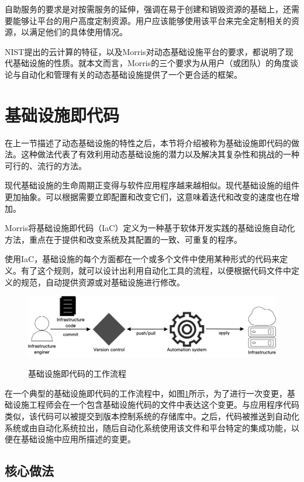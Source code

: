 \documentclass[macfonts,master]{njuthesis}
\begin{document}
自助服务的要求是对按需服务的延伸，强调在易于创建和销毁资源的基础上，还需要能够让平台的用户高度定制资源。用户应该能够使用该平台来完全定制相关的资源，以满足他们的具体使用情况\cite{morris2016infrastructure}。

NIST提出的云计算的特征，以及Morris对动态基础设施平台的要求，都说明了现代基础设施的性质。就本文而言，Morris的三个要求为从用户（或团队）的角度谈论与自动化和管理有关的动态基础设施提供了一个更合适的框架。

\section{基础设施即代码}
在上一节描述了动态基础设施的特性之后，本节将介绍被称为基础设施即代码的做法。这种做法代表了有效利用动态基础设施的潜力以及解决其复杂性和挑战的一种可行的、流行的方法。

现代基础设施的生命周期正变得与软件应用程序越来越相似。现代基础设施的组件更加抽象。可以根据需要立即配置和改变它们，这意味着迭代和改变的速度也在增加。

Morris将基础设施即代码（IaC）定义为一种基于软体开发实践的基础设施自动化方法，重点在于提供和改变系统及其配置的一致、可重复的程序\cite{morris2016infrastructure}。

使用IaC，基础设施的每个方面都在一个或多个文件中使用某种形式的代码来定义。有了这个规则，就可以设计出利用自动化工具的流程，以便根据代码文件中定义的规范，自动提供资源或对基础设施进行修改。

\begin{figure}[htbp]
  \centering
  \includegraphics[width= 1\textwidth]{pics/IaC.png}\\
  \caption{基础设施即代码的工作流程}\label{fig:IaC}
\end{figure}

在一个典型的基础设施即代码的工作流程中，如图\ref{fig:IaC}所示，为了进行一次变更，基础设施工程师会在一个包含基础设施代码的文件中表达这个变更。与应用程序代码类似，该代码可以被提交到版本控制系统的存储库中。之后，代码被推送到自动化系统或由自动化系统拉出，随后自动化系统使用该文件和平台特定的集成功能，以便在基础设施中应用所描述的变更\cite{whatisiac}。

\subsection{核心做法}
\end{document}
